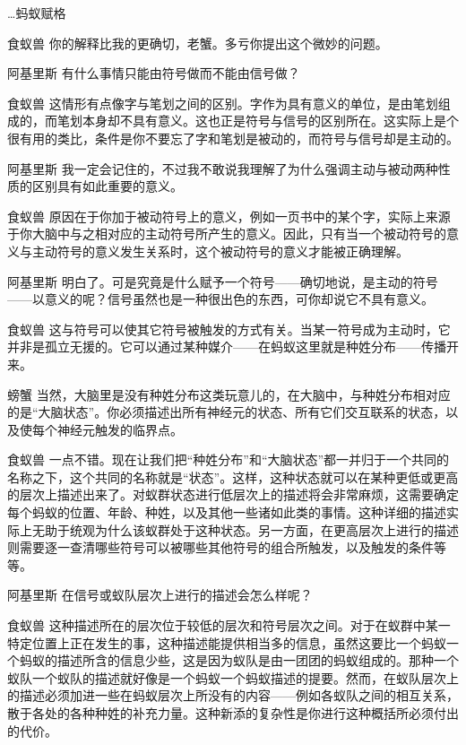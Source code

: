 \begin{dialog}{…蚂蚁赋格}
\begin{dialogue}
\item[食蚁兽]你的解释比我的更确切，老蟹。多亏你提出这个微妙的问题。

\item[阿基里斯]有什么事情只能由符号做而不能由信号做？

\item[食蚁兽]这情形有点像字与笔划之间的区别。字作为具有意义的单位，是由笔划组成的，而笔划本身却不具有意义。这也正是符号与信号的区别所在。这实际上是个很有用的类比，条件是你不要忘了字和笔划是被动的，而符号与信号却是主动的。

\item[阿基里斯]我一定会记住的，不过我不敢说我理解了为什么强调主动与被动两种性质的区别具有如此重要的意义。

\item[食蚁兽]原因在于你加于被动符号上的意义，例如一页书中的某个字，实际上来源于你大脑中与之相对应的主动符号所产生的意义。因此，只有当一个被动符号的意义与主动符号的意义发生关系时，这个被动符号的意义才能被正确理解。

\item[阿基里斯]明白了。可是究竟是什么赋予一个符号——确切地说，是主动的符号——以意义的呢？信号虽然也是一种很出色的东西，可你却说它不具有意义。

\item[食蚁兽]这与符号可以使其它符号被触发的方式有关。当某一符号成为主动时，它并非是孤立无援的。它可以通过某种媒介——在蚂蚁这里就是种姓分布——传播开来。

\item[螃蟹]当然，大脑里是没有种姓分布这类玩意儿的，在大脑中，与种姓分布相对应的是“大脑状态”。你必须描述出所有神经元的状态、所有它们交互联系的状态，以及使每个神经元触发的临界点。

\item[食蚁兽]一点不错。现在让我们把“种姓分布”和“大脑状态”都一并归于一个共同的名称之下，这个共同的名称就是“状态”。这样，这种状态就可以在某种更低或更高的层次上描述出来了。对蚁群状态进行低层次上的描述将会非常麻烦，这需要确定每个蚂蚁的位置、年龄、种姓，以及其他一些诸如此类的事情。这种详细的描述实际上无助于统观为什么该蚁群处于这种状态。另一方面，在更高层次上进行的描述则需要逐一查清哪些符号可以被哪些其他符号的组合所触发，以及触发的条件等等。

\item[阿基里斯]在信号或蚁队层次上进行的描述会怎么样呢？

\item[食蚁兽]这种描述所在的层次位于较低的层次和符号层次之间。对于在蚁群中某一特定位置上正在发生的事，这种描述能提供相当多的信息，虽然这要比一个蚂蚁一个蚂蚁的描述所含的信息少些，这是因为蚁队是由一团团的蚂蚁组成的。那种一个蚁队一个蚁队的描述就好像是一个蚂蚁一个蚂蚁描述的提要。然而，在蚁队层次上的描述必须加进一些在蚂蚁层次上所没有的内容——例如各蚁队之间的相互关系，散于各处的各种种姓的补充力量。这种新添的复杂性是你进行这种概括所必须付出的代价。


\end{dialogue}
\end{dialog}

